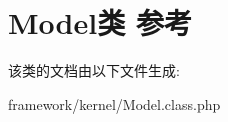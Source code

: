 \hypertarget{classModel}{\section{Model类 参考}
\label{classModel}
}


该类的文档由以下文件生成\+:\begin{DoxyCompactItemize}
\item 
framework/kernel/Model.\+class.\+php\end{DoxyCompactItemize}
